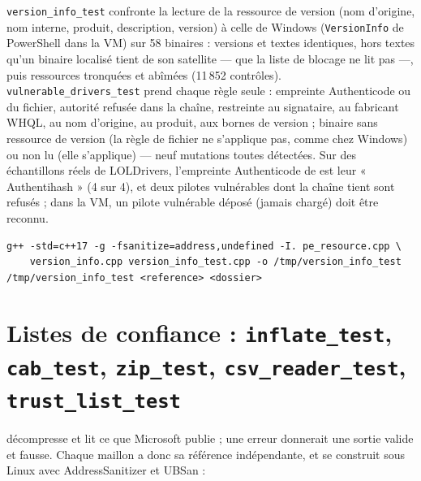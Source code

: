 \documentclass[11pt,a4paper,oneside]{report}
\begin{document}
\texttt{version\_info\_test} confronte la lecture de la ressource de version
(nom d'origine, nom interne, produit, description, version) à celle de
Windows (\texttt{VersionInfo} de PowerShell dans la VM) sur 58 binaires :
versions et textes identiques, hors textes qu'un binaire localisé tient de son
satellite  — que la liste de blocage ne lit pas —, puis
ressources tronquées et abîmées (11\,852 contrôles).
\texttt{vulnerable\_drivers\_test} prend chaque règle seule : empreinte
Authenticode ou du fichier, autorité refusée dans la chaîne, restreinte au
signataire, au fabricant WHQL, au nom d'origine, au produit, aux bornes de
version ; binaire sans ressource de version (la règle de fichier ne s'applique
pas, comme chez Windows) ou non lu (elle s'applique) — neuf mutations toutes
détectées. Sur des échantillons réels de LOLDrivers, l'empreinte Authenticode
de \wac{} est leur « Authentihash » (4 sur 4), et deux pilotes vulnérables dont
la chaîne tient sont refusés ; dans la VM, un pilote vulnérable déposé (jamais
chargé) doit être reconnu.

\begin{lstlisting}
g++ -std=c++17 -g -fsanitize=address,undefined -I. pe_resource.cpp \
    version_info.cpp version_info_test.cpp -o /tmp/version_info_test
/tmp/version_info_test <reference> <dossier>
\end{lstlisting}

\section{Listes de confiance : \texttt{inflate\_test}, \texttt{cab\_test}, \texttt{zip\_test}, \texttt{csv\_reader\_test}, \texttt{trust\_list\_test}}

 décompresse et lit ce que Microsoft publie ; une erreur
donnerait une sortie valide et fausse. Chaque maillon a donc sa référence
indépendante, et se construit sous Linux avec AddressSanitizer et UBSan :
\end{document}
